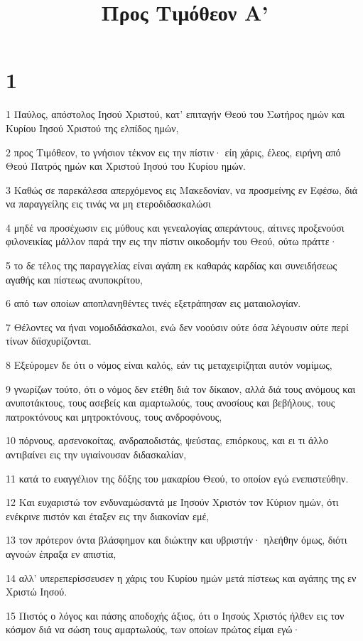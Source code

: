 

\title{Προς Τιμόθεον Α'}


\chapter{1}

\par 1 Παύλος, απόστολος Ιησού Χριστού, κατ' επιταγήν Θεού του Σωτήρος ημών και Κυρίου Ιησού Χριστού της ελπίδος ημών,
\par 2 προς Τιμόθεον, το γνήσιον τέκνον εις την πίστιν· είη χάρις, έλεος, ειρήνη από Θεού Πατρός ημών και Χριστού Ιησού του Κυρίου ημών.
\par 3 Καθώς σε παρεκάλεσα απερχόμενος εις Μακεδονίαν, να προσμείνης εν Εφέσω, διά να παραγγείλης εις τινάς να μη ετεροδιδασκαλώσι
\par 4 μηδέ να προσέχωσιν εις μύθους και γενεαλογίας απεράντους, αίτινες προξενούσι φιλονεικίας μάλλον παρά την εις την πίστιν οικοδομήν του Θεού, ούτω πράττε·
\par 5 το δε τέλος της παραγγελίας είναι αγάπη εκ καθαράς καρδίας και συνειδήσεως αγαθής και πίστεως ανυποκρίτου,
\par 6 από των οποίων αποπλανηθέντες τινές εξετράπησαν εις ματαιολογίαν.
\par 7 Θέλοντες να ήναι νομοδιδάσκαλοι, ενώ δεν νοούσιν ούτε όσα λέγουσιν ούτε περί τίνων διϊσχυρίζονται.
\par 8 Εξεύρομεν δε ότι ο νόμος είναι καλός, εάν τις μεταχειρίζηται αυτόν νομίμως,
\par 9 γνωρίζων τούτο, ότι ο νόμος δεν ετέθη διά τον δίκαιον, αλλά διά τους ανόμους και ανυποτάκτους, τους ασεβείς και αμαρτωλούς, τους ανοσίους και βεβήλους, τους πατροκτόνους και μητροκτόνους, τους ανδροφόνους,
\par 10 πόρνους, αρσενοκοίτας, ανδραποδιστάς, ψεύστας, επιόρκους, και ει τι άλλο αντιβαίνει εις την υγιαίνουσαν διδασκαλίαν,
\par 11 κατά το ευαγγέλιον της δόξης του μακαρίου Θεού, το οποίον εγώ ενεπιστεύθην.
\par 12 Και ευχαριστώ τον ενδυναμώσαντά με Ιησούν Χριστόν τον Κύριον ημών, ότι ενέκρινε πιστόν και έταξεν εις την διακονίαν εμέ,
\par 13 τον πρότερον όντα βλάσφημον και διώκτην και υβριστήν· ηλεήθην όμως, διότι αγνοών έπραξα εν απιστία,
\par 14 αλλ' υπερεπερίσσευσεν η χάρις του Κυρίου ημών μετά πίστεως και αγάπης της εν Χριστώ Ιησού.
\par 15 Πιστός ο λόγος και πάσης αποδοχής άξιος, ότι ο Ιησούς Χριστός ήλθεν εις τον κόσμον διά να σώση τους αμαρτωλούς, των οποίων πρώτος είμαι εγώ·
